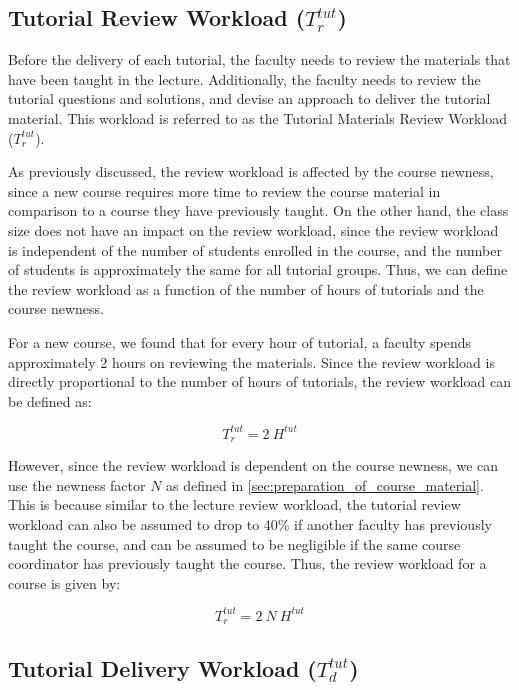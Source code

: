 \subsection{Tutorial Review Workload (\(T_r^{tut}\))}

Before the delivery of each tutorial, the faculty needs to review the materials that have been taught in the lecture. Additionally, the faculty needs to review the tutorial questions and solutions, and devise an approach to deliver the tutorial material. This workload is referred to as the Tutorial Materials Review Workload (\(T_r^{tut}\)).

As previously discussed, the review workload is affected by the course newness, since a new course requires more time to review the course material in comparison to a course they have previously taught. On the other hand, the class size does not have an impact on the review workload, since the review workload is independent of the number of students enrolled in the course, and the number of students is approximately the same for all tutorial groups. Thus, we can define the review workload as a function of the number of hours of tutorials and the course newness.

For a new course, we found that for every hour of tutorial, a faculty spends approximately 2 hours on reviewing the materials. Since the review workload is directly proportional to the number of hours of tutorials, the review workload can be defined as:

\begin{equation*}
  T_r^{tut} = 2\ H^{tut}
\end{equation*}

However, since the review workload is dependent on the course newness, we can use the newness factor \(N\) as defined in \autoref{sec:preparation_of_course_material}. This is because similar to the lecture review workload, the tutorial review workload can also be assumed to drop to 40\% if another faculty has previously taught the course, and can be assumed to be negligible if the same course coordinator has previously taught the course. Thus, the review workload for a course is given by:

\begin{equation}
  \label{eqn:tutorial-review-workload}
  T_r^{tut} = 2\ N \ H^{tut}
\end{equation}

\subsection{Tutorial Delivery Workload (\(T_d^{tut}\))}

